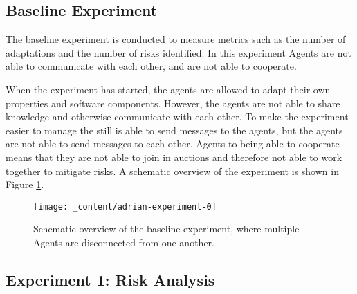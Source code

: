 \subsection{Baseline Experiment}


The baseline experiment is conducted to measure metrics such as the number of adaptations and the number of risks identified. In this experiment Agents are not able to communicate with each other, and are not able to cooperate. 

When the experiment has started, the agents are allowed to adapt their own properties and software components. However, the agents are not able to share knowledge and otherwise communicate with each other. To make the experiment easier to manage the  still is able to send messages to the agents, but the agents are not able to send messages to each other.  Agents to being able to cooperate means that they are not able to join in auctions and therefore not able to work together to mitigate risks. A schematic overview of the experiment is shown in Figure \ref{fig:baseline}.

\begin{figure}[H]
    \centering
    \texttt{[image: \_content/adrian-experiment-0]}
    \caption{Schematic overview of the baseline experiment, where multiple Agents are disconnected from one another.}
    \label{fig:baseline}
\end{figure}

\subsection{Experiment 1: Risk Analysis}

